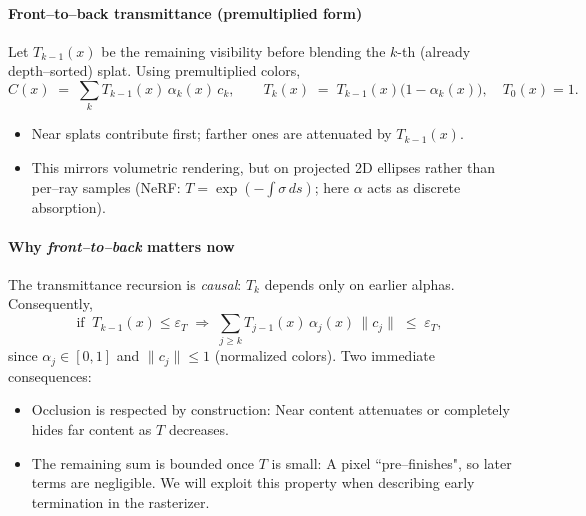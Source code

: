 \begin{enrichment}
\begin{enrichment}
\begin{enrichment}
        \paragraph{Front–to–back transmittance (premultiplied form)}
        Let $T_{k-1}(x)$ be the remaining visibility before blending the $k$-th (already depth–sorted) splat. Using premultiplied colors,
        \[
        C(x)\;=\;\sum_{k} T_{k-1}(x)\,\alpha_k(x)\,c_k,\qquad
        T_k(x)\;=\;T_{k-1}(x)\bigl(1-\alpha_k(x)\bigr),\quad T_0(x)=1.
        \]
        \begin{itemize}
            \item Near splats contribute first; farther ones are attenuated by $T_{k-1}(x)$.
            \item This mirrors volumetric rendering, but on projected 2D ellipses rather than per–ray samples (NeRF: $T=\exp(-\!\int\sigma\,ds)$; here $\alpha$ acts as discrete absorption).
        \end{itemize}
        
        \paragraph{Why \emph{front–to–back} matters now}
        The transmittance recursion is \emph{causal}: $T_k$ depends only on earlier alphas. Consequently,
        \[
        \text{if}\;\;T_{k-1}(x)\le \varepsilon_T \;\Rightarrow\;
        \sum_{j\ge k} T_{j-1}(x)\,\alpha_j(x)\,\|c_j\|
        \;\le\; \varepsilon_T,
        \]
        since $\alpha_j\in[0,1]$ and $\|c_j\|\le 1$ (normalized colors). Two immediate consequences:
        \begin{itemize}
            \item Occlusion is respected by construction: Near content attenuates or completely hides far content as $T$ decreases.
            \item The remaining sum is bounded once $T$ is small: A pixel “pre–finishes", so later terms are negligible. We will exploit this property when describing early termination in the rasterizer.
        \end{itemize}
        

\end{enrichment}
\end{enrichment}
\end{enrichment}
